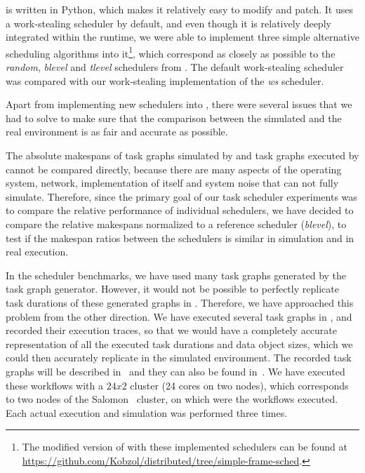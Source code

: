 \dask{} is written in Python, which makes it relatively easy to modify and patch.
It uses a work-stealing scheduler by default, and even though it is relatively deeply integrated
within the \dask{} runtime, we were able to implement three simple alternative
scheduling algorithms into it\footnote{The modified version of \dask{} with these implemented schedulers can be found at
\url{https://github.com/Kobzol/distributed/tree/simple-frame-sched}.}, which correspond as closely as possible to
the \emph{random}, \emph{blevel} and \emph{tlevel} schedulers from
\estee{}. The default work-stealing scheduler was compared with our work-stealing
implementation of the \emph{ws} scheduler.

Apart from implementing new schedulers into \dask{}, there were several issues that
we had to solve to make sure that the comparison between the simulated and the real environment is
as fair and accurate as possible.

The absolute makespans of task graphs simulated by \estee{} and task graphs executed
by \dask{} cannot be compared directly, because there are many aspects of the
operating system, network, implementation of \dask{} itself and system noise that
\estee{} can not fully simulate. Therefore, since the primary goal of our task
scheduler experiments was to compare the relative performance of individual schedulers, we have
decided to compare the relative makespans normalized to a reference scheduler
(\emph{blevel}), to test if the makespan ratios between the schedulers is similar in
simulation and in real execution.

In the scheduler benchmarks, we have used many task graphs generated by the \estee{}
task graph generator. However, it would not be possible to perfectly replicate task durations of
these generated graphs in \dask{}. Therefore, we have approached this problem from
the other direction. We have executed several task graphs in \dask{}, and recorded
their execution traces, so that we would have a completely accurate representation of all the
executed task durations and data object sizes, which we could then accurately replicate in the
simulated \estee{} environment. The recorded task graphs will be described
in~ and they can also be found in~\cite{rsds}. We have executed
these workflows with a $24x2$ cluster (\num{24} cores on two nodes),
which corresponds to two nodes of the Salomon~\cite{salomon} cluster, on which were the
\dask{} workflows executed. Each actual execution and simulation was performed
three times.


